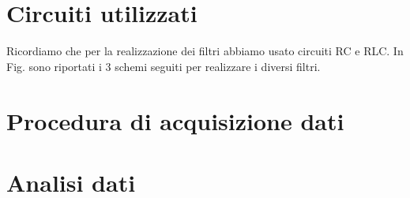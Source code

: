 \section{Circuiti utilizzati}
Ricordiamo che per la realizzazione dei filtri abbiamo usato circuiti RC e RLC. In Fig. sono riportati i 3 schemi seguiti per realizzare i diversi filtri. 


\section{Procedura di acquisizione dati}

\section{Analisi dati}